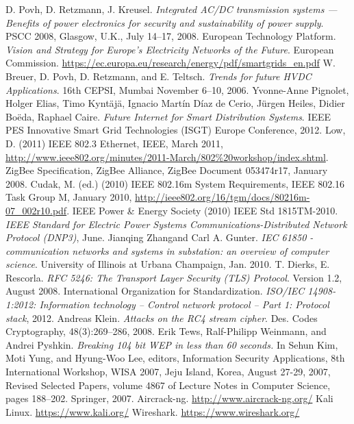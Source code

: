 \documentclass[11pt,oneside]{book}
\begin{document}
\begin{thebibliography}{99}
 D. Povh, D. Retzmann, J. Kreusel. \emph{Integrated AC/DC transmission systems — Benefits of power electronics for security and sustainability of power supply}. PSCC 2008, Glasgow, U.K., July 14–17, 2008. 
 European Technology Platform. \emph{Vision and Strategy for Europe’s Electricity Networks of the Future}. European Commission. \url{https://ec.europa.eu/research/energy/pdf/smartgrids_en.pdf}
 W. Breuer, D. Povh, D. Retzmann, and E. Teltsch. \emph{Trends for future HVDC Applications}. 16th CEPSI, Mumbai November 6–10, 2006.
 Yvonne-Anne Pignolet, Holger Elias, Timo Kyntäjä, Ignacio Martín Díaz de Cerio, Jürgen Heiles, Didier Boëda, Raphael Caire. \emph{Future Internet for Smart Distribution Systems}. IEEE PES Innovative Smart Grid Technologies (ISGT) Europe Conference, 2012.
 Low, D. (2011) IEEE 802.3 Ethernet, IEEE, March 2011, \url{http://www.ieee802.org/minutes/2011-March/802\%20workshop/index.shtml}.
 ZigBee Specification, ZigBee Alliance, ZigBee Document 053474r17, January 2008.
 Cudak, M. (ed.) (2010) IEEE 802.16m System Requirements, IEEE 802.16 Task Group M, January 2010, \url{http://ieee802.org/16/tgm/docs/80216m-07_002r10.pdf}.
 IEEE Power \& Energy Society (2010) IEEE Std 1815TM-2010. \emph{IEEE Standard for Electric Power Systems Communications-Distributed Network Protocol (DNP3)}, June.
 Jianqing Zhangand Carl A. Gunter. \emph{IEC 61850 - communication networks and systems in substation: an overview of computer science}.
University of Illinois at Urbana Champaign, Jan. 2010.
 T. Dierks, E. Rescorla. \emph{RFC 5246: The Transport Layer Security (TLS) Protocol}. Version 1.2, August 2008.
 International Organization for Standardization. \emph{ISO/IEC 14908-1:2012: Information technology – Control network protocol – Part 1: Protocol stack}, 2012.
 Andreas Klein. \emph{Attacks on the RC4 stream cipher}. Des. Codes Cryptography, 48(3):269–286, 2008.
 Erik Tews, Ralf-Philipp Weinmann, and Andrei Pyshkin. \emph{Breaking 104 bit WEP in less than 60 seconds.} In Sehun Kim, Moti Yung, and Hyung-Woo Lee, editors, Information Security Applications, 8th International Workshop, WISA 2007, Jeju Island, Korea, August 27-29, 2007, Revised Selected Papers, volume 4867 of Lecture Notes in Computer Science, pages 188–202. Springer, 2007.
 Aircrack-ng. \url{http://www.aircrack-ng.org/}
 Kali Linux. \url{https://www.kali.org/}
 Wireshark. \url{https://www.wireshark.org/}

\end{thebibliography}
\end{document}
